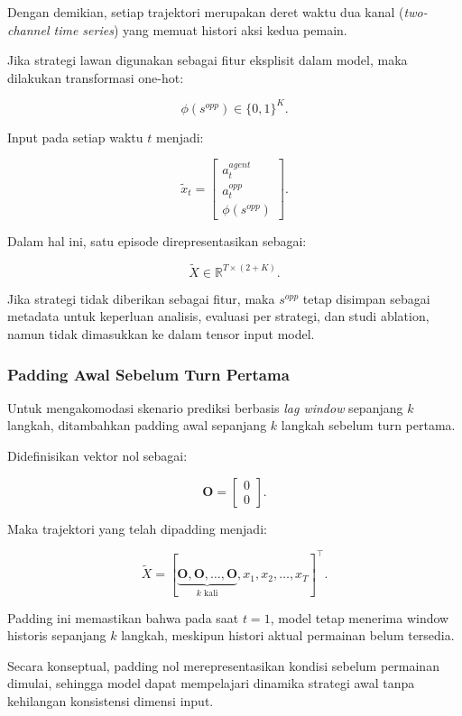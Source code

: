 Dengan demikian, setiap trajektori merupakan deret waktu dua kanal (\textit{two-channel time series}) yang memuat histori aksi kedua pemain.

Jika strategi lawan digunakan sebagai fitur eksplisit dalam model, maka dilakukan transformasi one-hot:

\[
\phi(s^{opp}) \in \{0,1\}^K.
\]

Input pada setiap waktu $t$ menjadi:

\[
\tilde{x}_t =
\begin{bmatrix}
a_t^{agent} \\
a_t^{opp} \\
\phi(s^{opp})
\end{bmatrix}.
\]

Dalam hal ini, satu episode direpresentasikan sebagai:

\[
\tilde{X} \in \mathbb{R}^{T \times (2 + K)}.
\]

Jika strategi tidak diberikan sebagai fitur, maka $s^{opp}$ tetap disimpan sebagai metadata untuk keperluan analisis, evaluasi per strategi, dan studi ablation, namun tidak dimasukkan ke dalam tensor input model.

\subsubsection{Padding Awal Sebelum Turn Pertama}

Untuk mengakomodasi skenario prediksi berbasis \textit{lag window} sepanjang $k$ langkah, ditambahkan padding awal sepanjang $k$ langkah sebelum turn pertama.

Didefinisikan vektor nol sebagai:

\[
\mathbf{O} =
\begin{bmatrix}
0 \\
0
\end{bmatrix}.
\]

Maka trajektori yang telah dipadding menjadi:

\[
\tilde{X} =
[\underbrace{\mathbf{O}, \mathbf{O}, \dots, \mathbf{O}}_{k \text{ kali}}, x_1, x_2, \dots, x_T]^\top.
\]

Padding ini memastikan bahwa pada saat $t = 1$, model tetap menerima window historis sepanjang $k$ langkah, meskipun histori aktual permainan belum tersedia.

Secara konseptual, padding nol merepresentasikan kondisi sebelum permainan dimulai, sehingga model dapat mempelajari dinamika strategi awal tanpa kehilangan konsistensi dimensi input.

